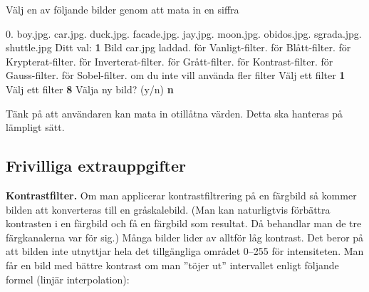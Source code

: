 {\setlength{\parindent}{0cm}

 Välj en av följande bilder genom att mata in en siffra\newline

0. boy.jpg. car.jpg. duck.jpg. facade.jpg. jay.jpg. moon.jpg. obidos.jpg. sgrada.jpg. shuttle.jpg\newline
Ditt val: \textbf{1}\newline
Bild car.jpg laddad. för Vanligt-filter. för Blått-filter. för Krypterat-filter. för Inverterat-filter. för Grått-filter. för Kontrast-filter. för Gauss-filter. för Sobel-filter. om du inte vill använda fler filter\newline
Välj ett filter \textbf{1}\newline
Välj ett filter \textbf{8}\newline
Välja ny bild? (y/n) \textbf{n}\newline
}

Tänk på att användaren kan mata in otillåtna värden. Detta ska hanteras på lämpligt sätt.

\subsection{Frivilliga extrauppgifter}

\Task \textbf{Kontrastfilter.} Om man applicerar kontrastfiltrering på en färgbild så kommer bilden att konverteras till en gråskalebild. (Man kan naturligtvis förbättra kontrasten i en färgbild och få en färgbild som resultat. Då behandlar man de tre färgkanalerna var för sig.) Många bilder lider av alltför låg kontrast. Det beror på att bilden inte utnyttjar hela det tillgängliga området 0–255 för intensiteten. Man får en bild med bättre kontrast om man ''töjer ut'' intervallet enligt följande formel (linjär interpolation):

